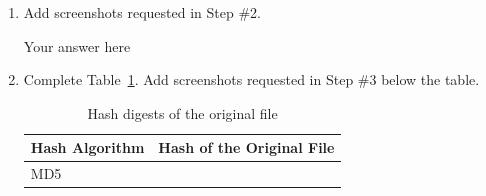 \documentclass[11pt,letterpaper]{article}
\newenvironment{answer}{\em \color{blue} \begin{adjustwidth}{1cm}{1cm}}{\end{adjustwidth}}
\begin{document}
	\begin{enumerate}
		
		\item Add screenshots requested in Step \#2.
		
		\begin{answer}
			Your answer here
		\end{answer}
		
		
		
		\item Complete Table~\ref{tab:hash-digest-originalhashfile}. Add screenshots requested in Step \#3 below the table.
		
				
				
				
				
		
		\begin{table}[h!]
			\caption{Hash digests of the original file
			} \label{tab:hash-digest-originalhashfile}
			\begin{tabularx}{\columnwidth}{|p{4cm}|X|}
				\hline
				\textbf{Hash Algorithm} & \textbf{Hash of the Original File} \\
				\hline
				MD5 &  \\\hline
				

\end{tabularx}
\end{table}
\end{enumerate}
\end{document}
